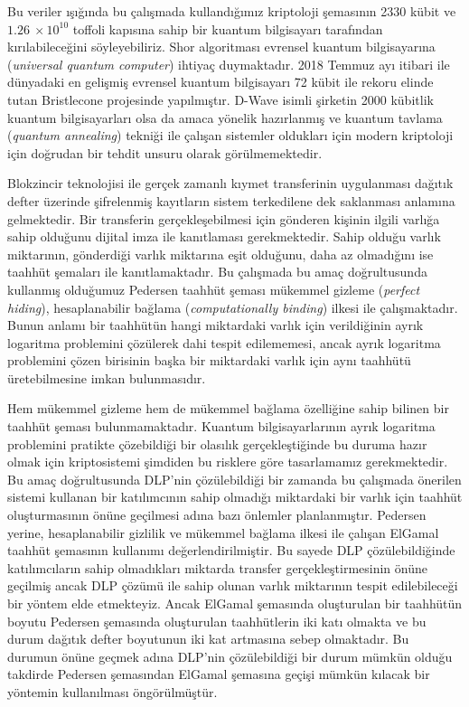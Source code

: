 \documentclass[a4paper,11pt]{article}
\begin{document}
Bu veriler ışığında bu çalışmada kullandığımız kriptoloji şemasının 2330 kübit ve $1.26\ \times 10^{10}$ toffoli kapısına sahip bir kuantum bilgisayarı tarafından kırılabileceğini söyleyebiliriz. Shor algoritması evrensel kuantum bilgisayarına (\emph{universal quantum computer}) ihtiyaç duymaktadır. 2018 Temmuz ayı itibari ile dünyadaki en gelişmiş evrensel kuantum bilgisayarı 72 kübit ile rekoru elinde tutan Bristlecone\cite{bristlecone} projesinde yapılmıştır. D-Wave isimli şirketin 2000 kübitlik kuantum bilgisayarları olsa da amaca yönelik hazırlanmış ve kuantum tavlama (\emph{quantum annealing}) tekniği ile çalışan sistemler oldukları için modern kriptoloji için doğrudan bir tehdit unsuru olarak görülmemektedir.

Blokzincir teknolojisi ile gerçek zamanlı kıymet transferinin uygulanması dağıtık defter üzerinde şifrelenmiş kayıtların sistem terkedilene dek saklanması anlamına gelmektedir. Bir transferin gerçekleşebilmesi için gönderen kişinin ilgili varlığa sahip olduğunu dijital imza ile kanıtlaması gerekmektedir. Sahip olduğu varlık miktarının, gönderdiği varlık miktarına eşit olduğunu, daha az olmadığını ise taahhüt şemaları ile kanıtlamaktadır. Bu çalışmada bu amaç doğrultusunda kullanmış olduğumuz Pedersen taahhüt şeması mükemmel gizleme (\emph{perfect hiding}), hesaplanabilir bağlama (\emph{computationally binding}) ilkesi ile çalışmaktadır. Bunun anlamı bir taahhütün hangi miktardaki varlık için verildiğinin ayrık logaritma problemini çözülerek dahi tespit edilememesi, ancak ayrık logaritma problemini çözen birisinin başka bir miktardaki varlık için aynı taahhütü üretebilmesine imkan bulunmasıdır.

Hem mükemmel gizleme hem de mükemmel bağlama özelliğine sahip bilinen bir taahhüt şeması bulunmamaktadır. Kuantum bilgisayarlarının ayrık logaritma problemini pratikte çözebildiği bir olasılık gerçekleştiğinde bu duruma hazır olmak için kriptosistemi şimdiden bu risklere göre tasarlamamız gerekmektedir. Bu amaç doğrultusunda DLP'nin çözülebildiği bir zamanda bu çalışmada önerilen sistemi kullanan bir katılımcının sahip olmadığı miktardaki bir varlık için taahhüt oluşturmasının önüne geçilmesi adına bazı önlemler planlanmıştır. Pedersen yerine, hesaplanabilir gizlilik ve mükemmel bağlama ilkesi ile çalışan ElGamal taahhüt şemasının kullanımı değerlendirilmiştir. Bu sayede DLP çözülebildiğinde katılımcıların sahip olmadıkları miktarda transfer gerçekleştirmesinin önüne geçilmiş ancak DLP çözümü ile sahip olunan varlık miktarının tespit edilebileceği bir yöntem elde etmekteyiz. Ancak ElGamal şemasında oluşturulan bir taahhütün boyutu Pedersen şemasında oluşturulan taahhütlerin iki katı olmakta ve bu durum dağıtık defter boyutunun iki kat artmasına sebep olmaktadır. Bu durumun önüne geçmek adına DLP'nin çözülebildiği bir durum mümkün olduğu takdirde Pedersen şemasından ElGamal şemasına geçişi mümkün kılacak bir yöntemin\cite{swcommits} kullanılması öngörülmüştür.
\end{document}
